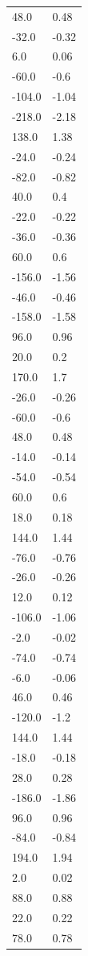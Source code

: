 \begin{longtable}{ll}
48.0 & 0.48 \\
-32.0 & -0.32 \\
6.0 & 0.06 \\
-60.0 & -0.6 \\
-104.0 & -1.04 \\
-218.0 & -2.18 \\
138.0 & 1.38 \\
-24.0 & -0.24 \\
-82.0 & -0.82 \\
40.0 & 0.4 \\
-22.0 & -0.22 \\
-36.0 & -0.36 \\
60.0 & 0.6 \\
-156.0 & -1.56 \\
-46.0 & -0.46 \\
-158.0 & -1.58 \\
96.0 & 0.96 \\
20.0 & 0.2 \\
170.0 & 1.7 \\
-26.0 & -0.26 \\
-60.0 & -0.6 \\
48.0 & 0.48 \\
-14.0 & -0.14 \\
-54.0 & -0.54 \\
60.0 & 0.6 \\
18.0 & 0.18 \\
144.0 & 1.44 \\
-76.0 & -0.76 \\
-26.0 & -0.26 \\
12.0 & 0.12 \\
-106.0 & -1.06 \\
-2.0 & -0.02 \\
-74.0 & -0.74 \\
-6.0 & -0.06 \\
46.0 & 0.46 \\
-120.0 & -1.2 \\
144.0 & 1.44 \\
-18.0 & -0.18 \\
28.0 & 0.28 \\
-186.0 & -1.86 \\
96.0 & 0.96 \\
-84.0 & -0.84 \\
194.0 & 1.94 \\
2.0 & 0.02 \\
88.0 & 0.88 \\
22.0 & 0.22 \\
78.0 & 0.78 \\

\end{longtable}
